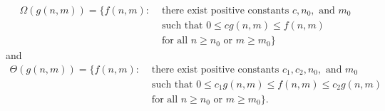 
\begin{equation*}
    \begin{split}
        \Omega(g(n, m)) = \lbrace f(n, m) : &\text{ there exist positive constants }
            c, n_0, \text{ and } m_0 \\
                                            &\text{ such that } 
            0 \leq c g(n, m) \leq f(n, m) \\
                                            &\text{ for all } n \geq n_0 \text{ or }
                                            m \geq m_0 \rbrace
    \end{split}
\end{equation*}
and
\begin{equation*}
    \begin{split}
        \Theta(g(n, m)) = \lbrace f(n, m) : &\text{ there exist positive constants }
            c_1, c_2, n_0, \text{ and } m_0 \\
                                            &\text{ such that } 
            0 \leq c_1 g(n, m) \leq f(n, m) \leq c_2 g(n, m) \\
                                            &\text{ for all } n \geq n_0 \text{ or }
                                            m \geq m_0 \rbrace.
    \end{split}
\end{equation*}
